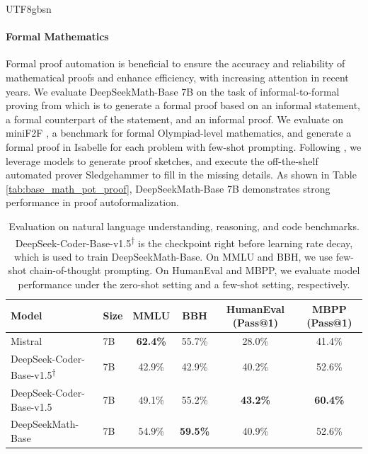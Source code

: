 \documentclass[11pt, a4paper, logo, copyright, nonumbering]{deepseek}
\newcommand{\spmath}{DeepSeekMath}
\begin{document}
\begin{CJK*}{UTF8}{gbsn}
\paragraph{Formal Mathematics}

Formal proof automation is beneficial to ensure the accuracy and reliability of mathematical proofs and enhance efficiency, with increasing attention in recent years.
We evaluate \spmath-Base 7B on the task of informal-to-formal proving from \citep{dsp_proof} which is to generate a formal proof based on an informal statement, a formal counterpart of the statement, and an informal proof.
We evaluate on miniF2F \citep{minif2f}, a benchmark for formal Olympiad-level mathematics, and generate a formal proof in Isabelle for each problem with few-shot prompting.
Following \cite{dsp_proof}, we leverage models to generate proof sketches, and execute the off-the-shelf automated prover Sledgehammer \citep{sledgehammer} to fill in the missing details.
As shown in Table \ref{tab:base_math_pot_proof}, \spmath-Base 7B demonstrates strong performance in proof autoformalization.

\begingroup
\setlength{\tabcolsep}{3pt} 
\renewcommand{\arraystretch}{1} 
\begin{table}[htb]
    \centering
\begin{small}

\begin{tabular}{llcccc} 
\toprule
\multicolumn{1}{l}{Model} &\multicolumn{1}{l}{Size}                      & MMLU   & BBH    & HumanEval (Pass@1) & MBPP (Pass@1)  \\ 
\midrule
Mistral & 7B                      & \textbf{62.4\%} & 55.7\% & 28.0\%             & 41.4\%         \\
\midrule
DeepSeek-Coder-Base-v1.5\textsuperscript{$\dag$} & 7B & 42.9\% & 42.9\% & 40.2\%             & 52.6\%         \\
DeepSeek-Coder-Base-v1.5 & 7B          & 49.1\% & 55.2\% & \textbf{43.2\%}             & \textbf{60.4\%}         \\ 
\midrule
\spmath-Base & 7B            & 54.9\% & \textbf{59.5\%} & 40.9\%             & 52.6\%         \\
\bottomrule
\end{tabular}
\end{small}
    \caption{
    Evaluation on natural language understanding, reasoning, and code benchmarks.
    DeepSeek-Coder-Base-v1.5\textsuperscript{$\dag$} is the checkpoint right before learning rate decay, which is used to train \spmath-Base.
    On MMLU and BBH, we use few-shot chain-of-thought prompting.
    On HumanEval and MBPP, we evaluate model performance under the zero-shot setting and a few-shot setting, respectively.
    }
    \label{tab:understanding_reasoning_code}
\end{table}
\endgroup


\end{CJK*}
\end{document}

